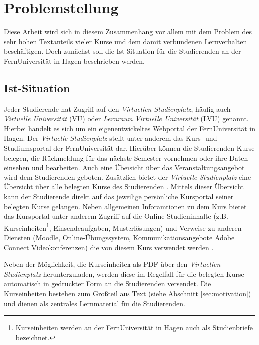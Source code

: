\section{Problemstellung}
Diese Arbeit wird sich in diesem Zusammenhang vor allem mit dem Problem des sehr hohen Textanteils vieler Kurse und dem damit verbundenen Lernverhalten beschäftigen. Doch zunächst soll die Ist-Situation für die Studierenden an der FernUniversität in Hagen beschrieben werden.

\subsection{Ist-Situation}
Jeder Studierende hat Zugriff auf den \textit{Virtuellen Studienplatz}, häufig auch \textit{Virtuelle Universität} (VU) oder \textit{Lernraum Virtuelle Universität} (LVU) genannt. Hierbei handelt es sich um ein eigenentwickeltes Webportal der FernUniversität in Hagen. Der \textit{Virtuelle Studienplatz} stellt unter anderem das Kurs- und Studiumsportal der FernUniversität dar. Hierüber können die Studierenden Kurse belegen, die Rückmeldung für das nächste Semester vornehmen oder ihre Daten einsehen und bearbeiten. Auch eine Übersicht über das Veranstaltungsangebot wird dem Studierenden geboten. Zusätzlich bietet der \textit{Virtuelle Studienplatz} eine Übersicht über alle belegten Kurse des Studierenden \citep{fernuniversitaet2018vu}. Mittels dieser Übersicht kann der Studierende direkt auf das jeweilige persönliche Kursportal seiner belegten Kurse gelangen. Neben allgemeinen Inforamtionen zu dem Kurs bietet das Kursportal unter anderem Zugriff auf die Online-Studieninhalte (z.B. Kurseinheiten\footnote{Kurseinheiten werden an der FernUniversität in Hagen auch als Studienbriefe bezeichnet.}, Einsendeaufgaben, Musterlösungen) und Verweise zu anderen Diensten (Moodle, Online-Übungssystem, Kommunikationsangebote Adobe Connect Videokonferenzen) die von diesem Kurs verwendet werden \citep{fernuniversitaet2018kurs}.

Neben der Möglichkeit, die Kurseinheiten als PDF über den \textit{Virtuellen Studienplatz} herunterzuladen, werden diese im Regelfall für die belegten Kurse automatisch in gedruckter Form an die Studierenden versendet. Die Kurseinheiten bestehen zum Großteil aus Text (siehe Abschnitt \ref{sec:motivation}) und dienen als zentrales Lernmaterial für die Studierenden.

